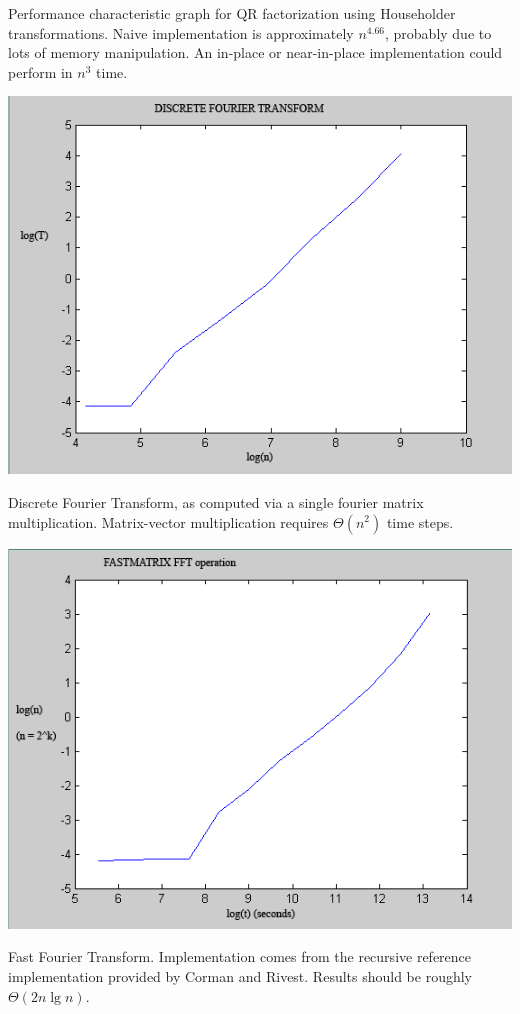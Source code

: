 \documentclass[10pt,fullpage]{article}
\begin{document}
Performance characteristic graph for QR factorization using
Householder transformations. Naive implementation is approximately
$n^{4.66}$, probably due to lots of memory manipulation. An in-place
or near-in-place implementation could perform in $n^3$ time.

\newpage

\includegraphics[scale=0.5]{./test_results/dft1.png}

Discrete Fourier Transform, as computed via a single fourier matrix
multiplication. Matrix-vector multiplication requires $\Theta(n^2)$
time steps.

\newpage

\includegraphics[scale=0.5]{./test_results/fft1.png}

Fast Fourier Transform. Implementation comes from the recursive
reference implementation provided by Corman and Rivest. Results
should be roughly $\Theta(2n \lg n)$.
\end{document}
